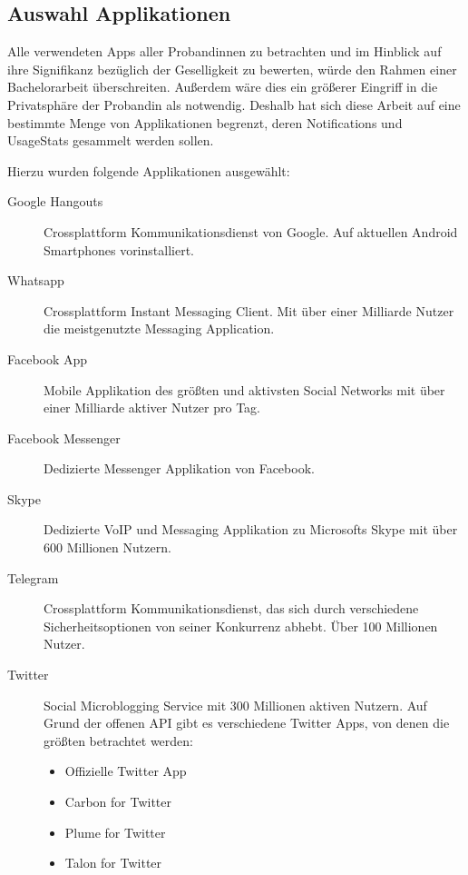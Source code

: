 \subsection{Auswahl Applikationen}

Alle verwendeten Apps aller Probandinnen zu betrachten und im Hinblick auf ihre Signifikanz bezüglich der Geselligkeit zu bewerten, würde den Rahmen einer Bachelorarbeit überschreiten.
Außerdem wäre dies ein größerer Eingriff in die Privatsphäre der Probandin als notwendig.
Deshalb hat sich diese Arbeit auf eine bestimmte Menge von Applikationen begrenzt, deren Notifications und UsageStats gesammelt werden sollen.


Hierzu wurden folgende Applikationen ausgewählt:
\begin{description}
  \item [Google Hangouts] Crossplattform Kommunikationsdienst von Google. Auf aktuellen Android Smartphones vorinstalliert.
  \item [Whatsapp] Crossplattform Instant Messaging Client. Mit über einer Milliarde Nutzer die meistgenutzte Messaging Application\cite{whatsappuser}.
  \item [Facebook App] Mobile Applikation des größten und aktivsten Social Networks mit über einer Milliarde aktiver Nutzer pro Tag\cite{facebookuser}.
  \item [Facebook Messenger] Dedizierte Messenger Applikation von Facebook.
  \item [Skype] Dedizierte VoIP und Messaging Applikation zu Microsofts Skype mit über 600 Millionen Nutzern\cite{skypeuser}.
  \item [Telegram] Crossplattform Kommunikationsdienst, das sich durch verschiedene Sicherheitsoptionen von seiner Konkurrenz abhebt. Über 100 Millionen Nutzer\cite{telegramuser}.
  \item [Twitter] Social Microblogging Service mit 300 Millionen aktiven Nutzern. Auf Grund der offenen API gibt es verschiedene Twitter Apps, von denen die größten betrachtet werden:
  \begin{itemize}
      \item Offizielle Twitter App
      \item Carbon for Twitter
      \item Plume for Twitter
      \item Talon for Twitter
  \end{itemize}
\end{description}




